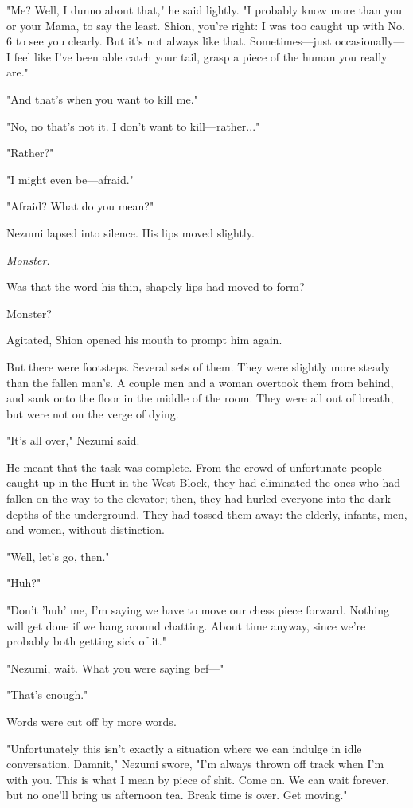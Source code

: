 "Me? Well, I dunno about that," he said lightly. "I probably know more
than you or your Mama, to say the least. Shion, you're right: I was too
caught up with No. 6 to see you clearly. But it's not always like that.
Sometimes---just occasionally---I feel like I've been able catch your tail,
grasp a piece of the human you really are."

"And that's when you want to kill me."

"No, no that's not it. I don't want to kill---rather..."

"Rather?"

"I might even be---afraid."

"Afraid? What do you mean?"

Nezumi lapsed into silence. His lips moved slightly.

\emph{Monster.}

Was that the word his thin, shapely lips had moved to form?

Monster?

Agitated, Shion opened his mouth to prompt him again.

But there were footsteps. Several sets of them. They were slightly more
steady than the fallen man's. A couple men and a woman overtook them
from behind, and sank onto the floor in the middle of the room. They
were all out of breath, but were not on the verge of dying.

"It's all over," Nezumi said.

He meant that the task was complete. From the crowd of unfortunate
people caught up in the Hunt in the West Block, they had eliminated the
ones who had fallen on the way to the elevator; then, they had hurled
everyone into the dark depths of the underground. They had tossed them
away: the elderly, infants, men, and women, without distinction.

"Well, let's go, then."

"Huh?"~

"Don't 'huh' me, I'm saying we have to move our chess piece forward.
Nothing will get done if we hang around chatting. About time anyway,
since we're probably both getting sick of it."

"Nezumi, wait. What you were saying bef---"

"That's enough."

Words were cut off by more words.

"Unfortunately this isn't exactly a situation where we can indulge in
idle conversation. Damnit," Nezumi swore, "I'm always thrown off track
when I'm with you. This is what I mean by piece of shit. Come on. We can
wait forever, but no one'll bring us afternoon tea. Break time is over.
Get moving."

